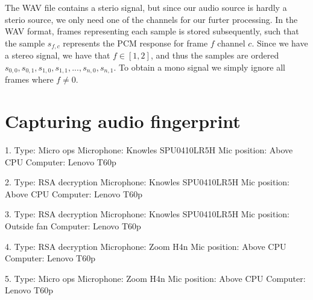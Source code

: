 The WAV file contains a sterio signal, but since our audio source is hardly a sterio source, we only need one of the channels for our furter processing.  In the WAV format, frames representing each sample is stored subsequently, such that the sample \( s_{f,c} \) represents the PCM  response for frame \( f \) channel \( c \). Since we have a stereo signal, we have that \( f \in \left [ 1, 2 \right ]  \), and thus the samples are ordered  \( s_{0,0}, s_{0,1}, s_{1,0}, s_{1,1}, ... , s_{n,0}, s_{n,1} \). To obtain a mono signal we simply ignore all frames where \( f \neq 0 \).


\section{Capturing audio fingerprint}\label{sec:ch3_capturing_audio_fingerprint}

1. 
Type: Micro ops
Microphone: Knowles SPU0410LR5H
Mic position: Above CPU
Computer: Lenovo T60p

2. 
Type: RSA decryption
Microphone: Knowles SPU0410LR5H
Mic position: Above CPU
Computer: Lenovo T60p

3.
Type: RSA decryption
Microphone: Knowles SPU0410LR5H
Mic position: Outside fan
Computer: Lenovo T60p

4. 
Type: RSA decryption
Microphone: Zoom H4n
Mic position: Above CPU
Computer: Lenovo T60p

5. 
Type: Micro ops
Microphone: Zoom H4n
Mic position: Above CPU
Computer: Lenovo T60p